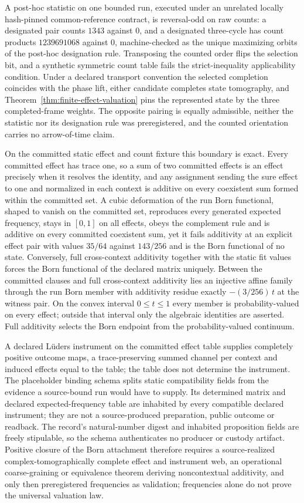 \documentclass[11pt]{article}
\begin{document}
A post-hoc statistic on one bounded run, executed under an unrelated locally
hash-pinned common-reference contract, is reversal-odd on raw counts: a
designated pair counts \(1343\) against \(0\), and a designated three-cycle
has count products \(1239691068\) against \(0\), machine-checked as the unique
maximizing orbits of the post-hoc designation rule. Transposing the counted
order flips the selection bit, and a synthetic symmetric count table fails the
strict-inequality applicability condition. Under a declared transport
convention the selected completion coincides with the phase lift, either
candidate completes state tomography, and
Theorem~\ref{thm:finite-effect-valuation} pins the represented state by the
three completed-frame weights. The opposite pairing is equally admissible,
neither the statistic nor its designation rule was preregistered, and the
counted orientation carries no arrow-of-time claim.

On the committed static effect and count fixture this boundary is exact.
Every committed effect has trace one, so a sum of two committed effects is an
effect precisely when it resolves the identity, and any assignment sending
the sure effect to one and normalized in each context is additive on every
coexistent sum formed within the committed set. A cubic deformation of the run
Born functional, shaped to vanish on the committed set, reproduces every
generated expected frequency, stays in \([0,1]\) on all effects, obeys the
complement rule and is additive on every committed coexistent sum, yet it
fails additivity at an explicit effect pair with values \(35/64\) against
\(143/256\) and is the Born functional of no state. Conversely, full
cross-context additivity together with the static fit values forces the Born
functional of the declared matrix uniquely. Between the committed clauses and
full cross-context additivity lies an injective affine family through the run
Born member with additivity residue exactly \(-(3/256)\,t\) at the witness
pair. On the convex interval \(0\leq t\leq1\) every member is
probability-valued on every effect; outside that interval only the algebraic
identities are asserted. Full additivity selects the Born endpoint from the
probability-valued continuum.

A declared L\"uders instrument on the committed effect table supplies
completely positive outcome maps, a trace-preserving summed channel per
context and induced effects equal to the table; the table does not determine
the instrument. The placeholder binding schema splits static compatibility
fields from the evidence a source-bound run would have to supply. Its
determined matrix and declared expected-frequency table are inhabited by
every compatible declared instrument; they are not a source-produced
preparation, public outcome or readback. The record's natural-number digest
and inhabited proposition fields are freely stipulable, so the schema
authenticates no producer or custody artifact. Positive closure of the Born
attachment therefore requires a source-realized complex-tomographically
complete effect and instrument web, an operational coarse-graining or
equivalence theorem deriving noncontextual additivity, and only then
preregistered frequencies as validation; frequencies alone do not prove the
universal valuation law.
\end{document}
